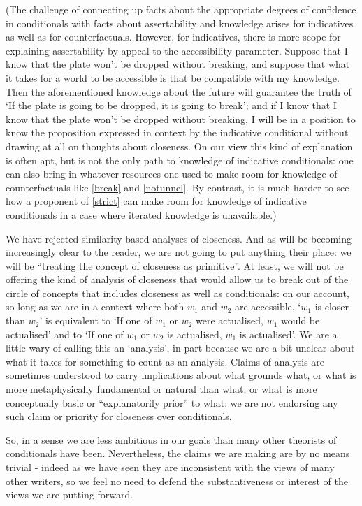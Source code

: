 \documentclass[leqno, 11pt, a5paper, openany]{article}
\begin{document}
(The challenge of connecting up facts about the appropriate degrees of confidence in conditionals with facts about assertability and knowledge arises for indicatives as well as for counterfactuals. However, for indicatives, there is more scope for explaining assertability by appeal to the accessibility parameter. Suppose that I know that the plate won't be dropped without breaking, and suppose that what it takes for a world to be accessible is that be compatible with my knowledge. Then the aforementioned knowledge about the future will guarantee the truth of ‘If the plate is going to be dropped, it is going to break’; and if I know that I know that the plate won't be dropped without breaking, I will be in a position to know the proposition expressed in context by the indicative conditional without drawing at all on thoughts about closeness. On our view this kind of explanation is often apt, but is not the only path to knowledge of indicative conditionals: one can also bring in whatever resources one used to make room for knowledge of counterfactuals like \ref{break} and \ref{notunnel}. By contrast, it is much harder to see how a proponent of \ref{strict} can make room for knowledge of indicative conditionals in a case where iterated knowledge is unavailable.)

We have rejected similarity-based analyses of closeness. And as will be becoming increasingly clear to the reader, we are not going to put anything their place: we will be “treating the concept of closeness as primitive”. At least, we will not be offering the kind of analysis of closeness that would allow us to break out of the circle of concepts that includes closeness as well as conditionals: on our account, so long as we are in a context where both $w_1$ and $w_2$ are accessible, ‘$w_1$ is closer than $w_2$’ is equivalent to ‘If one of $w_1$ or $w_2$ were actualised, $w_1$ would be actualised’ and to ‘If one of $w_1$ or $w_2$ is actualised, $w_1$ is actualised’. We are a little wary of calling this an ‘analysis’, in part because we are a bit unclear about what it takes for something to count as an analysis. Claims of analysis are sometimes understood to carry implications about what grounds what, or what is more metaphysically fundamental or natural than what, or what is more conceptually basic or “explanatorily prior” to what: we are not endorsing any such claim or priority for closeness over conditionals.

So, in a sense we are less ambitious in our goals than many other theorists of conditionals have been. Nevertheless, the claims we are making are by no means trivial - indeed as we have seen they are inconsistent with the views of many other writers, so we feel no need to defend the substantiveness or interest of the views we are putting forward.
\end{document}

